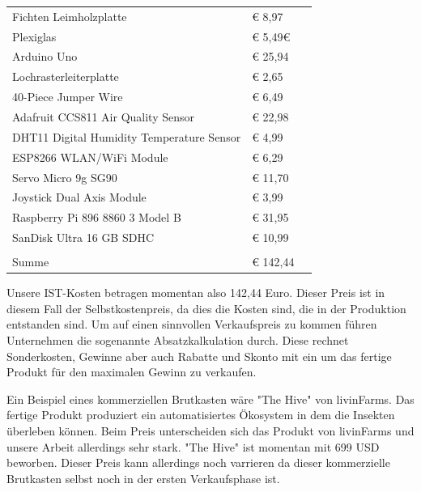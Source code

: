 	
\newline
		\caption{Kostenrechnung}
		\label{KORE}
\begin{table}[h]
	\begin{tabular}{lll}
		\centering
		Fichten	Leimholzplatte						 & € 8,97 		                  \\
		Plexiglas                   				 & € 5,49€                        \\
		Arduino Uno							    	 & € 25,94                        \\
		Lochrasterleiterplatte		                 & € 2,65                   	  \\
		40-Piece Jumper Wire 						 & € 6,49						  \\
		Adafruit CCS811 Air Quality Sensor     		 & € 22,98                        \\
		DHT11 Digital Humidity Temperature Sensor    & € 4,99                         \\
		ESP8266 WLAN/WiFi Module		             & € 6,29                         \\
		Servo Micro 9g SG90 						 & € 11,70   					  \\
		Joystick Dual Axis Module                    & € 3,99                  		  \\
		Raspberry Pi 896 8860 3 Model B  			 & € 31,95					      \\
		SanDisk Ultra 16 GB SDHC          			 & € 10,99                        \\
		\\
		Summe										 & € 142,44						  \\
	\end{tabular}
\end{table}

Unsere IST-Kosten betragen momentan also 142,44 Euro. Dieser Preis ist in diesem Fall der Selbstkostenpreis, da dies die Kosten sind, die in der Produktion entstanden sind. Um auf einen sinnvollen Verkaufspreis zu kommen führen Unternehmen die sogenannte Absatzkalkulation durch. Diese rechnet Sonderkosten, Gewinne aber auch Rabatte und Skonto mit ein um das fertige Produkt für den maximalen Gewinn zu verkaufen. 



Ein Beispiel eines kommerziellen Brutkasten wäre "The Hive" von livinFarms. Das fertige Produkt produziert ein automatisiertes Ökosystem in dem die Insekten überleben können. Beim Preis unterscheiden sich das Produkt von livinFarms und unsere Arbeit allerdings sehr stark.  "The Hive" ist momentan mit 699 USD beworben. Dieser Preis kann allerdings noch varrieren da dieser kommerzielle Brutkasten selbst noch in der ersten Verkaufsphase ist. 



